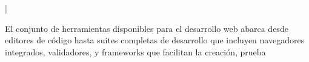 
|

El conjunto de herramientas disponibles para el desarrollo web abarca desde editores de código hasta suites completas de desarrollo que incluyen navegadores integrados, validadores, y frameworks que facilitan la creación, prueba


